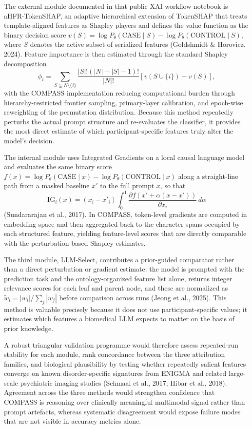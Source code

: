 \documentclass[11pt,a4paper,twoside]{article}
\begin{document}
The external module documented in that public XAI workflow notebook is aHFR-TokenSHAP, an adaptive hierarchical extension of TokenSHAP that treats template-aligned features as Shapley players and defines the value function as the binary decision score \(v(S) = \log P_{\theta}(\mathrm{CASE}\mid S) - \log P_{\theta}(\mathrm{CONTROL}\mid S)\), where \(S\) denotes the active subset of serialized features (Goldshmidt \& Horovicz, 2024). Feature importance is then estimated through the standard Shapley decomposition
\[
\phi_i = \sum_{S \subseteq N \setminus \{i\}}
\frac{|S|!(|N|-|S|-1)!}{|N|!}
\left[v(S \cup \{i\}) - v(S)\right],
\]
with the COMPASS implementation reducing computational burden through hierarchy-restricted frontier sampling, primary-layer calibration, and epoch-wise reweighting of the permutation distribution. Because this method repeatedly perturbs the actual prompt structure and re-evaluates the classifier, it provides the most direct estimate of which participant-specific features truly alter the model's decision.

The internal module uses Integrated Gradients on a local causal language model and evaluates the same binary score \(f(x) = \log P_{\theta}(\mathrm{CASE}\mid x) - \log P_{\theta}(\mathrm{CONTROL}\mid x)\) along a straight-line path from a masked baseline \(x'\) to the full prompt \(x\), so that
\[
\mathrm{IG}_i(x) = (x_i - x'_i) \int_0^1
\frac{\partial f\!\left(x' + \alpha(x-x')\right)}{\partial x_i}\, d\alpha
\]
(Sundararajan et al., 2017). In COMPASS, token-level gradients are computed in embedding space and then aggregated back to the character spans occupied by each structured feature, yielding feature-level scores that are directly comparable with the perturbation-based Shapley estimates.

The third module, LLM-Select, contributes a prior-guided comparator rather than a direct perturbation or gradient estimate: the model is prompted with the prediction task and the ontology-organized feature list alone, returns integer relevance scores for each leaf and parent node, and these are normalized as \(\tilde{w}_i = |w_i| / \sum_j |w_j|\) before comparison across runs (Jeong et al., 2025). This method is valuable precisely because it does not use participant-specific values; it estimates which features a biomedical LLM expects to matter on the basis of prior knowledge.

A robust triangular validation programme would therefore assess repeated-run stability for each module, rank concordance between the three attribution families, and biological plausibility by testing whether repeatedly salient features converge on known disorder-specific signatures from ENIGMA and related large-scale psychiatric imaging studies (Schmaal et al., 2017; Hibar et al., 2018). Agreement across the three methods would strengthen confidence that COMPASS is reasoning over clinically meaningful multimodal signal rather than prompt artefacts, whereas systematic disagreement would expose failure modes that are not visible in accuracy metrics alone.
\end{document}
